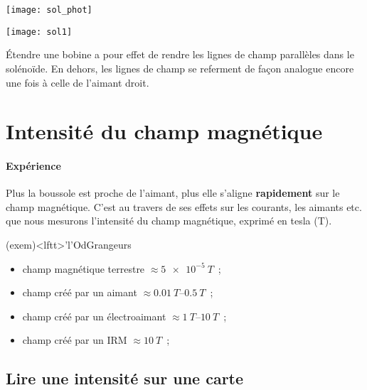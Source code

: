 \documentclass[../../main/main.tex]{subfiles}
\begin{document}
\noindent
\begin{minipage}[c]{.5\linewidth}
	\centering
	\texttt{[image: sol\_phot]}
	\label{fig:solphot}
\end{minipage}
\hfill
\begin{minipage}[c]{.5\linewidth}
	\centering
	\texttt{[image: sol1]}
	\label{fig:sol1}
\end{minipage}

Étendre une bobine a pour effet de rendre les lignes de champ parallèles dans le
solénoïde. En dehors, les lignes de champ se referment de façon analogue encore
une fois à celle de l'aimant droit.

\section{Intensité du champ magnétique}
\label{sec:intchp}
\paragraph*{Expérience} Plus la boussole est proche de l'aimant, plus elle
s'aligne \textbf{rapidement} sur le champ magnétique. C'est au travers de ses
effets sur les courants, les aimants etc. que nous mesurons l'intensité du champ
magnétique, exprimé en tesla (\si{T}).
\begin{tcb}(exem)<lftt>'l'{OdGrangeurs}
	\begin{itemize}
		\item champ magnétique terrestre      $ \approx \SI{5e-5}{T} $~;
		\item champ créé par un aimant        $ \approx \SIrange{0.01}{0.5}{T} $~;
		\item champ créé par un électroaimant $ \approx \SIrange{1}{10}{T} $~;
		\item champ créé par un IRM           $ \approx \SI{10}{T} $~;
	\end{itemize}
\end{tcb}

\subsection{Lire une intensité sur une carte}
\end{document}
